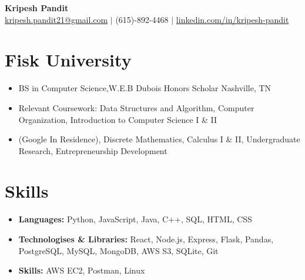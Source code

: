 \documentclass[letterpaper,10pt]{article}
\begin{document}
\begin{center}
  {\LARGE\bfseries Kripesh Pandit} \\[4pt]
  \small
  \href{mailto:kripesh.pandit21@gmail.com}{kripesh.pandit21@gmail.com}   $|$ (615)-892-4468   $|$ \href{https://linkedin.com/in/kripesh-pandit}{linkedin.com/in/kripesh-pandit}    \end{center}





\section{Fisk University}
\begin{itemize}
  \item BS in Computer Science,W.E.B Dubois Honors Scholar Nashville, TN
  \item Relevant Coursework: Data Structures and Algorithm, Computer Organization, Introduction to Computer Science I \& II
  \item (Google In Residence), Discrete Mathematics, Calculus I \& II, Undergraduate Research, Entrepreneurship Development
\end{itemize}




\section{Skills}
\begin{itemize}[label={}]
  \item \textbf{Languages:} Python, JavaScript, Java, C++, SQL, HTML, CSS
  \item \textbf{Technologises \& Libraries:} React, Node.js, Express, Flask, Pandas, PostgreSQL, MySQL, MongoDB, AWS S3, SQLite, Git
  \item \textbf{Skills:} AWS EC2, Postman, Linux
\end{itemize}
\end{document}
